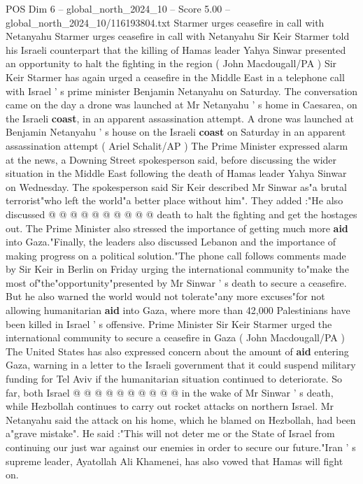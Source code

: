 \begin{textsample}{POS Dim 6 – global\_north\_2024\_10 – Score 5.00 – global\_north\_2024\_10/116193804.txt}  \label{ex:f6_pos_392}
Starmer urges ceasefire in call with Netanyahu Starmer urges ceasefire in call with Netanyahu Sir Keir Starmer told his Israeli counterpart that the killing of Hamas leader Yahya Sinwar presented an opportunity to halt the fighting in the region ( John Macdougall/PA ) Sir Keir Starmer has again urged a ceasefire in the Middle East in a telephone call with Israel ' s prime minister Benjamin Netanyahu on Saturday.
The conversation came on the day a drone was launched at Mr Netanyahu ' s home in Caesarea, on the Israeli \textbf{coast}, in an apparent assassination attempt.
A drone was launched at Benjamin Netanyahu ' s house on the Israeli \textbf{coast} on Saturday in an apparent assassination attempt ( Ariel Schalit/AP ) The Prime Minister expressed alarm at the news, a Downing Street spokesperson said, before discussing the wider situation in the Middle East following the death of Hamas leader Yahya Sinwar on Wednesday.
The spokesperson said Sir Keir described Mr Sinwar as"a brutal terrorist"who left the world"a better place without him".
They added :"He also discussed @ @ @ @ @ @ @ @ @ @ death to halt the fighting and get the hostages out.
The Prime Minister also stressed the importance of getting much more \textbf{aid} into Gaza."Finally, the leaders also discussed Lebanon and the importance of making progress on a political solution."The phone call follows comments made by Sir Keir in Berlin on Friday urging the international community to"make the most of"the"opportunity"presented by Mr Sinwar ' s death to secure a ceasefire.
But he also warned the world would not tolerate"any more excuses"for not allowing humanitarian \textbf{aid} into Gaza, where more than 42,000 Palestinians have been killed in Israel ' s offensive.
Prime Minister Sir Keir Starmer urged the international community to secure a ceasefire in Gaza ( John Macdougall/PA ) The United States has also expressed concern about the amount of \textbf{aid} entering Gaza, warning in a letter to the Israeli government that it could suspend military funding for Tel Aviv if the humanitarian situation continued to deteriorate.
So far, both Israel @ @ @ @ @ @ @ @ @ @ in the wake of Mr Sinwar ' s death, while Hezbollah continues to carry out rocket attacks on northern Israel.
Mr Netanyahu said the attack on his home, which he blamed on Hezbollah, had been a"grave mistake".
He said :"This will not deter me or the State of Israel from continuing our just war against our enemies in order to secure our future."Iran ' s supreme leader, Ayatollah Ali Khamenei, has also vowed that Hamas will fight on.

\end{textsample}
